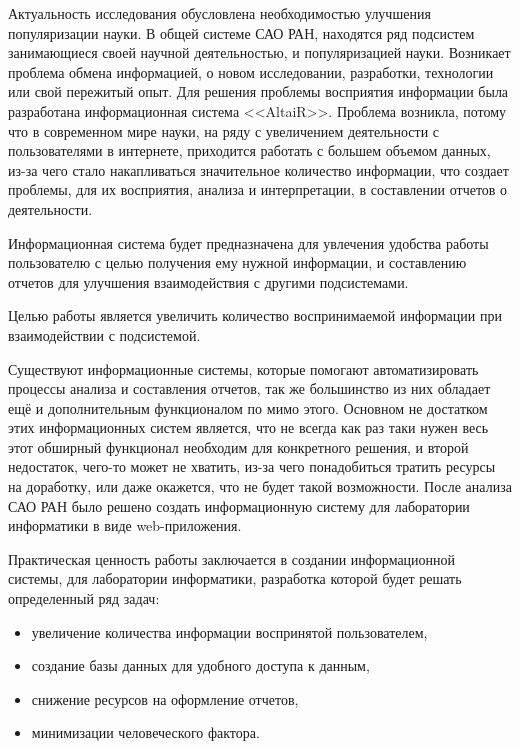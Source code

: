 Актуальность исследования обусловлена необходимостью улучшения популяризации науки. В общей системе САО РАН, находятся ряд подсистем занимающиеся своей научной деятельностью, и популяризацией науки. Возникает проблема обмена информацией, о новом исследовании, разработки, технологии или свой пережитый опыт. Для решения проблемы восприятия информации была разработана информационная система <<AltaiR>>. Проблема возникла, потому что в современном мире науки, на ряду с увеличением деятельности с пользователями в интернете, приходится работать с большем объемом данных, из-за чего стало накапливаться значительное количество информации, что создает проблемы, для их восприятия, анализа и интерпретации, в составлении отчетов о деятельности. 

Информационная система будет предназначена для увлечения удобства работы пользователю с целью получения ему нужной информации, и составлению отчетов для улучшения взаимодействия с другими подсистемами.

Целью работы является увеличить количество воспринимаемой информации при взаимодействии с подсистемой. 

Существуют информационные системы, которые помогают автоматизировать процессы анализа и составления отчетов, так же большинство из них обладает ещё и дополнительным функционалом по мимо этого. Основном не достатком этих информационных систем является, что не всегда как раз таки нужен весь этот обширный функционал необходим для конкретного решения, и второй недостаток, чего-то может не хватить, из-за чего понадобиться тратить ресурсы на доработку, или даже окажется, что не будет такой возможности. После анализа САО РАН было решено создать информационную систему для лаборатории информатики в виде web-приложения.

Практическая ценность работы заключается в создании информационной системы, для лаборатории информатики, разработка которой будет решать определенный ряд задач:
\begin{itemize}
	\item увеличение количества информации воспринятой пользователем,
	\item создание базы данных для удобного доступа к данным,
	\item снижение ресурсов на оформление отчетов,
	\item минимизации человеческого фактора.
\end{itemize}


